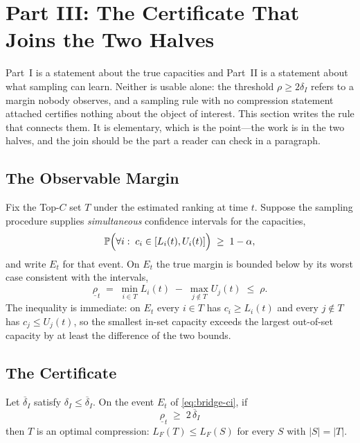\section{Part III: The Certificate That Joins the Two Halves}
\label{sec:bridge}

Part~I is a statement about the true capacities and Part~II is a statement about what
sampling can learn. Neither is usable alone: the threshold $\rho\ge2\delta_{I}$ refers to a
margin nobody observes, and a sampling rule with no compression statement attached certifies
nothing about the object of interest. This section writes the rule that connects them. It is
elementary, which is the point---the work is in the two halves, and the join should be the
part a reader can check in a paragraph.

\subsection{The Observable Margin}

Fix the Top-$C$ set $T$ under the estimated ranking at time $t$. Suppose the sampling
procedure supplies \emph{simultaneous} confidence intervals for the capacities,
\begin{equation}
\mathbb{P}\Bigl(\forall i:\;c_{i}\in[L_{i}(t),U_{i}(t)]\Bigr)\;\ge\;1-\alpha ,
\label{eq:bridge-ci}
\end{equation}
and write $E_{t}$ for that event. On $E_{t}$ the true margin is bounded below by its worst
case consistent with the intervals,
\begin{equation}
\underline{\rho}_{t}\;=\;\min_{i\in T}L_{i}(t)\;-\;\max_{j\notin T}U_{j}(t)
\;\le\;\rho .
\label{eq:bridge-rho}
\end{equation}
The inequality is immediate: on $E_{t}$ every $i\in T$ has $c_{i}\ge L_{i}(t)$ and every
$j\notin T$ has $c_{j}\le U_{j}(t)$, so the smallest in-set capacity exceeds the largest
out-of-set capacity by at least the difference of the two bounds.

\subsection{The Certificate}

\begin{proposition}
\label{prop:certificate}
Let $\overline{\delta}_{I}$ satisfy $\delta_{I}\le\overline{\delta}_{I}$. On the event
$E_{t}$ of \eqref{eq:bridge-ci}, if
\begin{equation}
\underline{\rho}_{t}\;\ge\;2\,\overline{\delta}_{I}
\label{eq:bridge-rule}
\end{equation}
then $T$ is an optimal compression: $L_{F}(T)\le L_{F}(S)$ for every $S$ with $|S|=|T|$.
\end{proposition}

